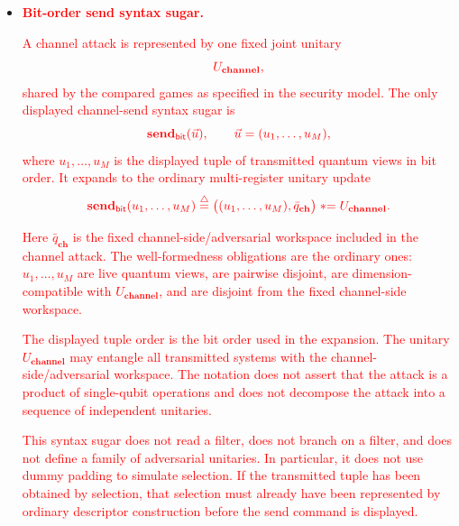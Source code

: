 \documentclass[acmsmall,screen,review,anonymous,nonacm]{acmart}
\theoremstyle{defn_style}
\newcommand{\asteq}{\mathrel{*}=}
\begin{document}
\begin{itemize}
    \textcolor{red}{This descriptor construction is the only mechanism used here to represent
    filtered or fixed-size sublists. If a selected quantum tuple is later
    transmitted, the later transmission must be displayed as}
    \[
    \textcolor{red}{\mathbf{send}_{\mathsf{bit}}(\vec u)
    }
    \]
    \textcolor{red}{on the already constructed tuple \(\vec u\), in displayed bit order. The
    \(\mathbf{select}\) syntax sugar does not define a channel order and cannot
    be replaced by channel reordering.}

    \item \textcolor{red}{\textbf{Bit-order send syntax sugar.}}
    
    \textcolor{red}{A channel attack is represented by one fixed joint unitary}
    \[
    \textcolor{red}{
    U_{\textbf{channel}},
    }
    \]
    \textcolor{red}{shared by the compared games as specified in the security model. The only
    displayed channel-send syntax sugar is}
    \[
    \textcolor{red}{
    \mathbf{send}_{\mathsf{bit}}(\vec u),
    \qquad
    \vec u=(u_1,\ldots,u_M),
    }
    \]
    \textcolor{red}{where \(u_1,\ldots,u_M\) is the displayed tuple of transmitted quantum
    views in bit order. It expands to the ordinary multi-register unitary
    update}
    \[
    \textcolor{red}{
    \mathbf{send}_{\mathsf{bit}}(u_1,\ldots,u_M)
    \stackrel{\triangle}{=}
    \bigl((u_1,\ldots,u_M),\bar q_{\mathbf{ch}}\bigr)
    \asteq
    U_{\textbf{channel}} .
    }
    \]
    
    \textcolor{red}{Here \(\bar q_{\mathbf{ch}}\) is the fixed channel-side/adversarial
    workspace included in the channel attack. The well-formedness obligations
    are the ordinary ones: \(u_1,\ldots,u_M\) are live quantum views, are
    pairwise disjoint, are dimension-compatible with \(U_{\textbf{channel}}\),
    and are disjoint from the fixed channel-side workspace.}
    
    \textcolor{red}{The displayed tuple order is the bit order used in the expansion. The
    unitary \(U_{\textbf{channel}}\) may entangle all transmitted systems with
    the channel-side/adversarial workspace. The notation does not assert that
    the attack is a product of single-qubit operations and does not decompose
    the attack into a sequence of independent unitaries.}
    
    \textcolor{red}{This syntax sugar does not read a filter, does not branch on a filter, and
    does not define a family of adversarial unitaries. In particular, it does not use dummy
    padding to simulate selection. If the transmitted tuple has been obtained
    by selection, that selection must already have been represented by ordinary
    descriptor construction before the send command is displayed.}
    

\end{itemize}
\end{document}
